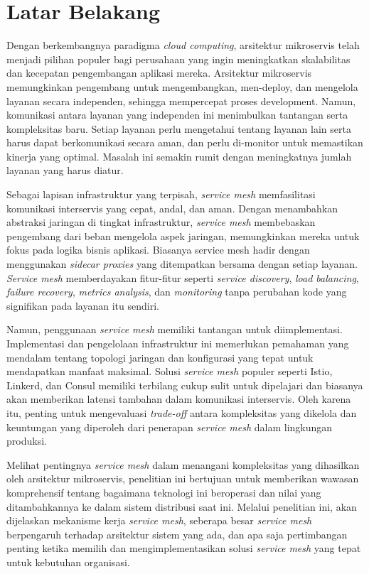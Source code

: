 \section{Latar Belakang}

Dengan berkembangnya paradigma \textit{cloud computing}, arsitektur mikroservis telah menjadi pilihan populer bagi perusahaan yang ingin meningkatkan skalabilitas dan kecepatan pengembangan aplikasi mereka. Arsitektur mikroservis memungkinkan pengembang untuk mengembangkan, men-deploy, dan mengelola layanan secara independen, sehingga mempercepat proses development. Namun, komunikasi antara layanan yang independen ini menimbulkan tantangan serta kompleksitas baru. Setiap layanan perlu mengetahui tentang layanan lain serta harus dapat berkomunikasi secara aman, dan perlu di-monitor untuk memastikan kinerja yang optimal. Masalah ini semakin rumit dengan meningkatnya jumlah layanan yang harus diatur.

Sebagai lapisan infrastruktur yang terpisah, \textit{service mesh} memfasilitasi komunikasi interservis yang cepat, andal, dan aman. Dengan menambahkan abstraksi jaringan di tingkat infrastruktur, \textit{service mesh} membebaskan pengembang dari beban mengelola aspek jaringan, memungkinkan mereka untuk fokus pada logika bisnis aplikasi. Biasanya service mesh hadir dengan menggunakan \textit{sidecar proxies} yang ditempatkan bersama dengan setiap layanan. \textit{Service mesh} memberdayakan fitur-fitur seperti \textit{service discovery}, \textit{load balancing}, \textit{failure recovery}, \textit{metrics analysis}, dan \textit{monitoring} tanpa perubahan kode yang signifikan pada layanan itu sendiri.

Namun, penggunaan \textit{service mesh} memiliki tantangan untuk diimplementasi. Implementasi dan pengelolaan infrastruktur ini memerlukan pemahaman yang mendalam tentang topologi jaringan dan konfigurasi yang tepat untuk mendapatkan manfaat maksimal. Solusi \textit{service mesh} populer seperti Istio, Linkerd, dan Consul memiliki terbilang cukup sulit untuk dipelajari dan biasanya akan memberikan latensi tambahan dalam komunikasi interservis. Oleh karena itu, penting untuk mengevaluasi \textit{trade-off} antara kompleksitas yang dikelola dan keuntungan yang diperoleh dari penerapan \textit{service mesh} dalam lingkungan produksi.

Melihat pentingnya \textit{service mesh} dalam menangani kompleksitas yang dihasilkan oleh arsitektur mikroservis, penelitian ini bertujuan untuk memberikan wawasan komprehensif tentang bagaimana teknologi ini beroperasi dan nilai yang ditambahkannya ke dalam sistem distribusi saat ini. Melalui penelitian ini, akan dijelaskan mekanisme kerja \textit{service mesh}, seberapa besar \textit{service mesh} berpengaruh terhadap arsitektur sistem yang ada, dan apa saja pertimbangan penting ketika memilih dan mengimplementasikan solusi \textit{service mesh} yang tepat untuk kebutuhan organisasi.